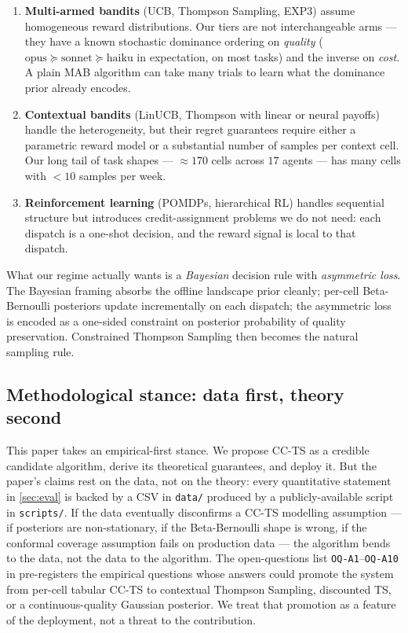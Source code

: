 \begin{enumerate}[leftmargin=*]
  \item \textbf{Multi-armed bandits} (UCB, Thompson Sampling, EXP3) assume
        homogeneous reward distributions. Our tiers are not interchangeable
        arms --- they have a known stochastic dominance ordering on
        \emph{quality} ($\text{opus} \succeq \text{sonnet} \succeq \text{haiku}$
        in expectation, on most tasks) and the inverse on \emph{cost}. A
        plain MAB algorithm can take many trials to learn what the dominance
        prior already encodes.

  \item \textbf{Contextual bandits} (LinUCB, Thompson with linear or neural
        payoffs) handle the heterogeneity, but their regret guarantees require
        either a parametric reward model or a substantial number of samples
        per context cell. Our long tail of task shapes --- $\approx 170$ cells
        across $17$ agents --- has many cells with $< 10$ samples per
        week.

  \item \textbf{Reinforcement learning} (POMDPs, hierarchical RL) handles
        sequential structure but introduces credit-assignment problems we do
        not need: each dispatch is a one-shot decision, and the reward signal
        is local to that dispatch.
\end{enumerate}

What our regime actually wants is a \emph{Bayesian} decision rule with
\emph{asymmetric loss}. The Bayesian framing absorbs the offline landscape
prior cleanly; per-cell Beta-Bernoulli posteriors update incrementally on
each dispatch; the asymmetric loss is encoded as a one-sided constraint on
posterior probability of quality preservation. Constrained Thompson Sampling
\cite{wu2016conservative,amani2019linear} then becomes the natural sampling
rule.

\subsection{Methodological stance: data first, theory second}
\label{sec:stance}

This paper takes an empirical-first stance. We propose CC-TS as a credible
candidate algorithm, derive its theoretical guarantees, and deploy it. But
the paper's claims rest on the data, not on the theory: every quantitative
statement in \cref{sec:eval} is backed by a CSV in
\texttt{data/} produced by a publicly-available script in
\texttt{scripts/}. If the data eventually disconfirms a CC-TS modelling
assumption --- if posteriors are non-stationary, if the Beta-Bernoulli
shape is wrong, if the conformal coverage assumption fails on production
data --- the algorithm bends to the data, not the data to the algorithm.
The open-questions list \texttt{OQ-A1}--\texttt{OQ-A10} in
\cite{blackrim_moa1c} pre-registers the empirical questions whose answers
could promote the system from per-cell tabular CC-TS to contextual
Thompson Sampling, discounted TS, or a continuous-quality Gaussian
posterior. We treat that promotion as a feature of the deployment, not a
threat to the contribution.

